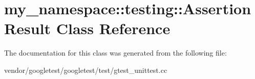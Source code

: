 \hypertarget{classmy__namespace_1_1testing_1_1_assertion_result}{}\section{my\+\_\+namespace\+:\+:testing\+:\+:Assertion\+Result Class Reference}
\label{classmy__namespace_1_1testing_1_1_assertion_result}


The documentation for this class was generated from the following file\+:\begin{DoxyCompactItemize}
\item 
vendor/googletest/googletest/test/gtest\+\_\+unittest.\+cc\end{DoxyCompactItemize}
